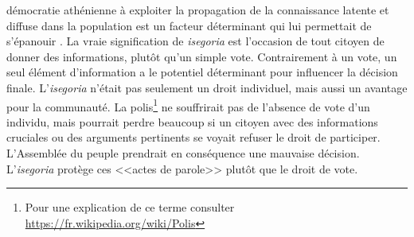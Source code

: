 démocratie athénienne à exploiter la propagation de la connaissance
latente et diffuse dans la population est un facteur déterminant qui lui
permettait de s'épanouir \cite{ober08}. La vraie signification de 
\emph{isegoria} est l'occasion de tout citoyen de donner des
informations, plutôt qu'un simple vote. Contrairement à un vote, un
seul élément d'information a le potentiel déterminant pour influencer la
décision finale. L'\emph{isegoria} n'était pas seulement un droit
individuel, mais aussi un avantage pour la communauté. La
polis\footnote{%
  Pour une explication de ce terme consulter
  \url{https://fr.wikipedia.org/wiki/Polis}%
} ne souffrirait pas de l'absence de vote d'un individu, mais pourrait
perdre beaucoup si un citoyen avec des informations cruciales 
ou des arguments pertinents se voyait refuser le droit de
participer. L'Assemblée du peuple prendrait en conséquence une
mauvaise décision. L'\emph{isegoria} protège ces <<actes de parole>>
plutôt que le droit de vote.\par

